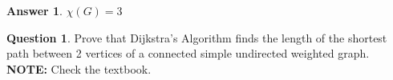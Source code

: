 \documentclass[article, 12pt]{article}
\theoremstyle{definition}
\newtheorem{question}{Question}
\newtheorem{answer}{Answer}
\begin{document}
    \begin{answer}
        $\chi(G) = 3$
    \end{answer}
    \begin{question}
        Prove that  Dijkstra's Algorithm  finds the length of the  shortest path between 2 vertices  of a  connected simple undirected  weighted  graph.\\ {\bf NOTE:} Check  the textbook.
    \end{question}
\end{document}
